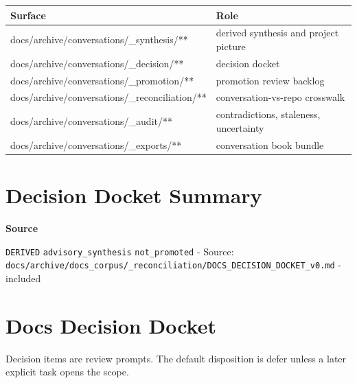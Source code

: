 \documentclass[10.5pt,a4paper,openany]{book}
\newcommand{\toprule}{\hline}
\newcommand{\midrule}{\hline}
\newcommand{\bottomrule}{\hline}
\newcommand{\vonecallout}[3]{\par\medskip\noindent\begingroup\setlength{\fboxsep}{7pt}\colorbox{DomCalloutBg}{\parbox{0.94\linewidth}{\textbf{\textcolor{#1}{#2}}\par #3}}\endgroup\par\medskip}
\begin{document}
\begin{center}
{\small\renewcommand{\arraystretch}{1.18}
\begin{tabularx}{\linewidth}{@{}>{\raggedright\arraybackslash}X >{\raggedright\arraybackslash}X@{}}
\toprule
\textbf{Surface} & \textbf{Role} \\
\midrule
docs/\allowbreak{}archive/\allowbreak{}conversations/\allowbreak{}\_\allowbreak{}synthesis/\allowbreak{}** & derived synthesis and project picture \\
docs/\allowbreak{}archive/\allowbreak{}conversations/\allowbreak{}\_\allowbreak{}decision/\allowbreak{}** & decision docket \\
docs/\allowbreak{}archive/\allowbreak{}conversations/\allowbreak{}\_\allowbreak{}promotion/\allowbreak{}** & promotion review backlog \\
docs/\allowbreak{}archive/\allowbreak{}conversations/\allowbreak{}\_\allowbreak{}reconciliation/\allowbreak{}** & conversation-\allowbreak{}vs-\allowbreak{}repo crosswalk \\
docs/\allowbreak{}archive/\allowbreak{}conversations/\allowbreak{}\_\allowbreak{}audit/\allowbreak{}** & contradictions, staleness, uncertainty \\
docs/\allowbreak{}archive/\allowbreak{}conversations/\allowbreak{}\_\allowbreak{}exports/\allowbreak{}** & conversation book bundle \\
\bottomrule
\end{tabularx}
}
\end{center}



\section{Decision Docket Summary}

\vonecallout{DomSlate}{Source}{\texttt{DERIVED} \texttt{advisory\_\allowbreak{}synthesis} \texttt{not\_\allowbreak{}promoted} -\allowbreak{} Source: \texttt{docs/\allowbreak{}archive/\allowbreak{}docs\_\allowbreak{}corpus/\allowbreak{}\_\allowbreak{}reconciliation/\allowbreak{}DOCS\_\allowbreak{}DECISION\_\allowbreak{}DOCKET\_\allowbreak{}v0.\allowbreak{}md} -\allowbreak{} included}

\section{Docs Decision Docket}

Decision items are review prompts.\allowbreak{} The default disposition is defer unless a later explicit task opens the scope.\allowbreak{}
\end{document}
